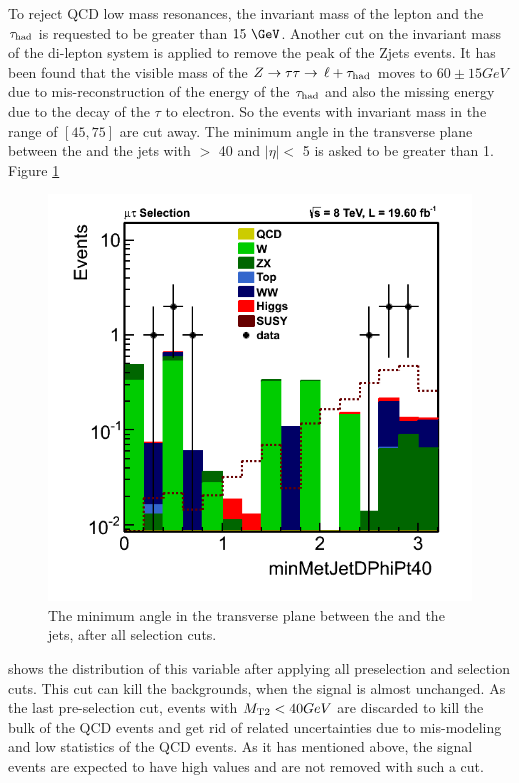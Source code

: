 To reject QCD low mass resonances, the invariant mass of the lepton and the $\tau_{\rm had}$ is requested to be greater than $15\ \GeV$. Another cut on the invariant mass of the di-lepton system is applied to remove the peak of the Zjets events. It has been found that the visible mass of the $Z\to\tau\tau\to\,\ell +\tau_{\rm had}$ moves to $60 \pm 15 GeV$ due to mis-reconstruction of the energy of the $\tau_{\rm had}$ and also the missing energy due to the decay of the $\tau$ to electron. So the events with invariant mass in the range of $[45,75]$ are cut away. The minimum angle in the transverse plane between the \MET and the jets with \PT $>$ 40 \GeVc and $|\eta| <$ 5 is asked to be greater than 1. Figure \ref{fig:minDphi}
\begin{figure}[!Hhtb]
\centering
\includegraphics[angle=0,scale=0.35]{SelectionMuTau/minMetJetDPhi.png}
\caption{The minimum angle in the transverse plane between the \MET and the jets, after all \muTau selection cuts.}
\label{fig:minDphi}
\end{figure}
shows the distribution of this variable after applying all preselection and selection cuts. This cut can kill the backgrounds, 
when the signal is almost unchanged.
As the last pre-selection cut, events with ${M_{\rm T2}}<40 GeV$ are discarded to kill the bulk of the QCD events and get rid of related uncertainties due to mis-modeling and low statistics 
of the QCD events. As it has mentioned above, the signal events are expected to have high \mttwo values and are not removed with such a cut.

